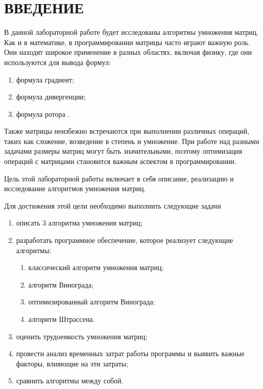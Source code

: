 \chapter*{ВВЕДЕНИЕ}


В данной лабораторной работе будет исследованы алгоритмы умножения матриц. Как и в математике, в программировании матрицы часто играют важную роль. Они находят широкое применение в разных областях, включая физику, где они используются для вывода формул:
\begin{enumerate}
	\item формула градиент;
	\item формула дивергенции;
	\item формула ротора \cite{book_matrix}. 
\end{enumerate}

Также матрицы неизбежно встречаются при выполнении различных операций, таких как сложение, возведение в степень и умножение. При работе над разными задачами размеры матриц могут быть значительными, поэтому оптимизация операций с матрицами становится важным аспектом в программировании.

Цель этой лабораторной работы включает в себя описание, реализацию и исследование алгоритмов умножения матриц.

Для достижения этой цели необходимо выполнить следующие задачи
\begin{enumerate}
	\item описать 3 алгоритма умножения матриц;
	\item разработать программное обеспечение, которое реализует следующие алгоритмы:
	\begin{enumerate}
		\item классический алгоритм умножения матриц;
		\item алгоритм Винограда;
		\item оптимизированный алгоритм Винограда;
		\item алгоритм Штрассена.
	\end{enumerate}
	\item оценить трудоемкость умножения матриц;
	\item провести анализ временных затрат работы программы и выявить важные факторы, влияющие на эти затраты;
	\item сравнить алгоритмы между собой.
\end{enumerate}
